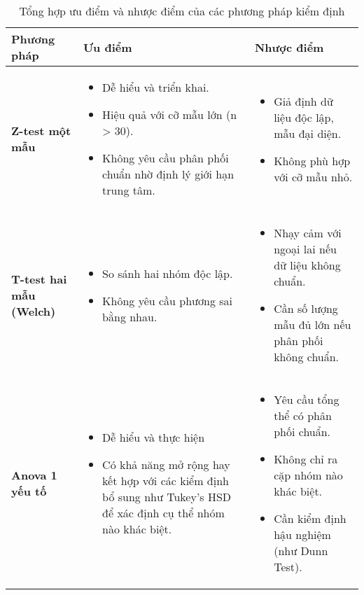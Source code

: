 \begin{table}[H]
\centering
\caption{Tổng hợp ưu điểm và nhược điểm của các phương pháp kiểm định}
\label{tab:summary_tests}
\renewcommand{\arraystretch}{1} %
\begin{tabular}{|p{3.2cm}|p{5.5cm}|p{5.5cm}|}
    
\hline
\textbf{Phương pháp} & \textbf{Ưu điểm} & \textbf{Nhược điểm} \\ \hline
\textbf{Z-test một mẫu} &
\begin{itemize}[leftmargin=*, topsep=0pt, partopsep=0pt, parsep=0pt, itemsep=0pt]
\item Dễ hiểu và triển khai.
    \item Hiệu quả với cỡ mẫu lớn (n > 30).
    \item Không yêu cầu phân phối chuẩn nhờ định lý giới hạn trung tâm.
\end{itemize} &
\begin{itemize}[leftmargin=*, topsep=0pt, partopsep=0pt, parsep=0pt, itemsep=0pt]
    \item Giả định dữ liệu độc lập, mẫu đại diện.
    \item Không phù hợp với cỡ mẫu nhỏ.
\end{itemize} \\ \hline
\textbf{T-test hai mẫu (Welch)} &
\begin{itemize}[leftmargin=*, topsep=0pt, partopsep=0pt, parsep=0pt, itemsep=0pt]
    \item So sánh hai nhóm độc lập.
    \item Không yêu cầu phương sai bằng nhau.
\end{itemize} &
\begin{itemize}[leftmargin=*, topsep=0pt, partopsep=0pt, parsep=0pt, itemsep=0pt]
    \item Nhạy cảm với ngoại lai nếu dữ liệu không chuẩn.
    \item Cần số lượng mẫu đủ lớn nếu phân phối không chuẩn.
\end{itemize} \\ \hline
\textbf{Anova 1 yếu tố}&
\begin{itemize}[leftmargin=*, topsep=0pt, partopsep=0pt, parsep=0pt, itemsep=0pt]
    \item  Dễ hiểu và thực hiện
    \item Có khả năng mở rộng hay kết hợp với các kiểm định bổ sung như Tukey's HSD để xác định cụ thể nhóm nào khác biệt.
\end{itemize} &
\begin{itemize}[leftmargin=*, topsep=0pt, partopsep=0pt, parsep=0pt, itemsep=0pt]
    \item Yêu cầu tổng thể có phân phối chuẩn.
    \item Không chỉ ra cặp nhóm nào khác biệt.
    \item Cần kiểm định hậu nghiệm (như Dunn Test).
\end{itemize} \\ \hline


\end{tabular}
\end{table}
